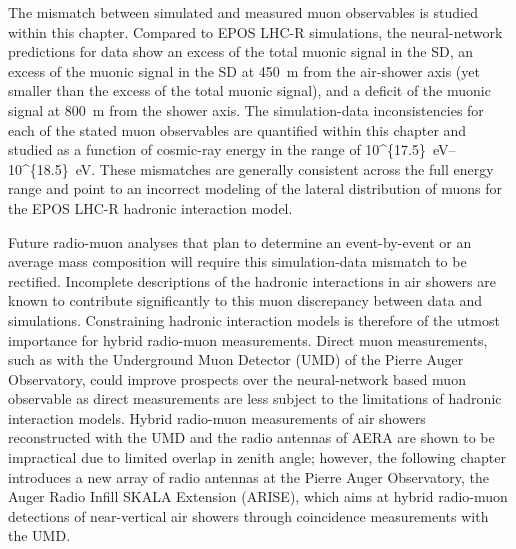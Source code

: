 The mismatch between simulated and measured muon observables is studied within this chapter.
Compared to EPOS LHC-R simulations, the neural-network predictions for data show an excess of the total muonic signal in the SD, an excess of the muonic signal in the SD at \qty{450}{\meter} from the air-shower axis (yet smaller than the excess of the total muonic signal), and a deficit of the muonic signal at \qty{800}{\meter} from the shower axis.
The simulation-data inconsistencies for each of the stated muon observables are quantified within this chapter and studied as a function of cosmic-ray energy in the range of \qtyrange[parse-numbers=false]{10^{17.5}}{10^{18.5}}{\electronvolt}.
These mismatches are generally consistent across the full energy range and point to an incorrect modeling of the lateral distribution of muons for the EPOS LHC-R hadronic interaction model.

Future radio-muon analyses that plan to determine an event-by-event or an average mass composition will require this simulation-data mismatch to be rectified.
Incomplete descriptions of the hadronic interactions in air showers are known to contribute significantly to this muon discrepancy between data and simulations.
Constraining hadronic interaction models is therefore of the utmost importance for hybrid radio-muon measurements.
Direct muon measurements, such as with the Underground Muon Detector (UMD) of the Pierre Auger Observatory, could improve prospects over the neural-network based muon observable as direct measurements are less subject to the limitations of hadronic interaction models.
Hybrid radio-muon measurements of air showers reconstructed with the UMD and the radio antennas of AERA are shown to be impractical due to limited overlap in zenith angle; however, the following chapter introduces a new array of radio antennas at the Pierre Auger Observatory, the Auger Radio Infill SKALA Extension (ARISE), which aims at hybrid radio-muon detections of near-vertical air showers through coincidence measurements with the UMD.




